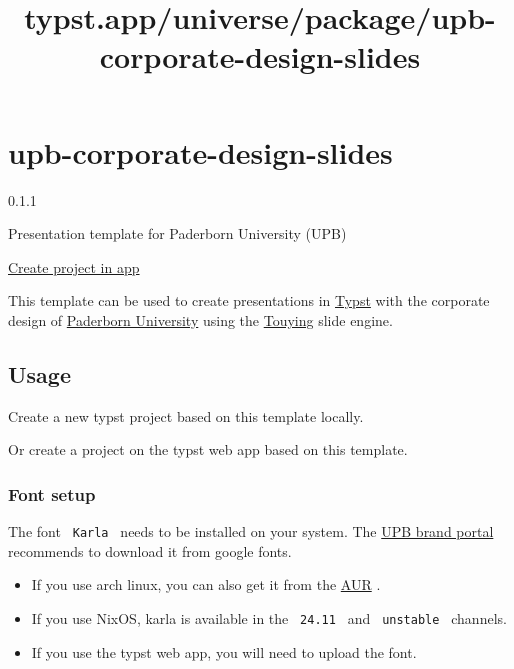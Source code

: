 \title{typst.app/universe/package/upb-corporate-design-slides}

\label{banner}
\label{template-thumbnail}

\section{upb-corporate-design-slides}\label{upb-corporate-design-slides}

{ 0.1.1 }

Presentation template for Paderborn University (UPB)

\href{/app?template=upb-corporate-design-slides&version=0.1.1}{Create
project in app}

\label{readme}
This template can be used to create presentations in
\href{https://typst.app/docs/}{Typst} with the corporate design of
\href{https://www.uni-paderborn.de/}{Paderborn University} using the
\href{https://touying-typ.github.io/}{Touying} slide engine.

\subsection{Usage}\label{usage}

Create a new typst project based on this template locally.

\begin{Shaded}
\begin{Highlighting}[]
\end{Highlighting}
\end{Shaded}

Or create a project on the typst web app based on this template.

\subsubsection{Font setup}\label{font-setup}

The font \texttt{\ Karla\ } needs to be installed on your system. The
\href{https://www.uni-paderborn.de/universitaet/presse-kommunikation-marketing/brandportal}{UPB
brand portal} recommends to download it from google fonts.

\begin{itemize}
\tightlist
\item
  If you use arch linux, you can also get it from the
  \href{https://aur.archlinux.org/packages/ttf-karla}{AUR} .
\item
  If you use NixOS, karla is available in the \texttt{\ 24.11\ } and
  \texttt{\ unstable\ } channels.
\item
  If you use the typst web app, you will need to upload the font.
\end{itemize}


